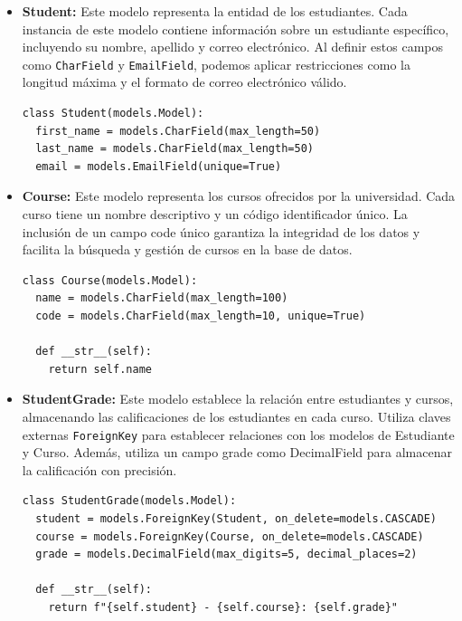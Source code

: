 \documentclass[10pt, a4paper]{article}
\newcommand{\mpy}[1]{\texttt{#1}}
\begin{document}
\begin{itemize}
  \item \textbf{Student:} Este modelo representa la entidad de los estudiantes. Cada instancia de este modelo contiene información sobre un estudiante específico, incluyendo su nombre, apellido y correo electrónico. Al definir estos campos como \mpy{CharField} y \mpy{EmailField}, podemos aplicar restricciones como la longitud máxima y el formato de correo electrónico válido.

\begin{verbatim}
class Student(models.Model):
  first_name = models.CharField(max_length=50)
  last_name = models.CharField(max_length=50)
  email = models.EmailField(unique=True)
\end{verbatim}

  \item \textbf{Course:} Este modelo representa los cursos ofrecidos por la universidad. Cada curso tiene un nombre descriptivo y un código identificador único. La inclusión de un campo code único garantiza la integridad de los datos y facilita la búsqueda y gestión de cursos en la base de datos.

\begin{verbatim}
class Course(models.Model):
  name = models.CharField(max_length=100)
  code = models.CharField(max_length=10, unique=True)

  def __str__(self):
    return self.name
\end{verbatim}

  \item \textbf{StudentGrade:} Este modelo establece la relación entre estudiantes y cursos, almacenando las calificaciones de los estudiantes en cada curso. Utiliza claves externas \mpy{ForeignKey} para establecer relaciones con los modelos de Estudiante y Curso. Además, utiliza un campo grade como DecimalField para almacenar la calificación con precisión.

\begin{verbatim}
class StudentGrade(models.Model):
  student = models.ForeignKey(Student, on_delete=models.CASCADE)
  course = models.ForeignKey(Course, on_delete=models.CASCADE)
  grade = models.DecimalField(max_digits=5, decimal_places=2)

  def __str__(self):
    return f"{self.student} - {self.course}: {self.grade}"
\end{verbatim}

\end{itemize}
\end{document}
